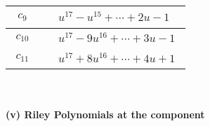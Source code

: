 \documentclass[1p]{elsarticle_modified}
\theoremstyle{definition}
\begin{document}
\begin{tabular}{m{50pt}|m{274pt}}
\hline $$\begin{aligned}c_{9}\end{aligned}$$&$\begin{aligned}
&u^{17}- u^{15}+\cdots+2 u-1
\end{aligned}$\\
\hline $$\begin{aligned}c_{10}\end{aligned}$$&$\begin{aligned}
&u^{17}-9 u^{16}+\cdots+3 u-1
\end{aligned}$\\
\hline $$\begin{aligned}c_{11}\end{aligned}$$&$\begin{aligned}
&u^{17}+8 u^{16}+\cdots+4 u+1
\end{aligned}$\\
\hline
\end{tabular}\\~\\
\newpage\renewcommand{\arraystretch}{1}
\flushleft \textbf{(v) Riley Polynomials at the component}\newline \\
\end{document}
